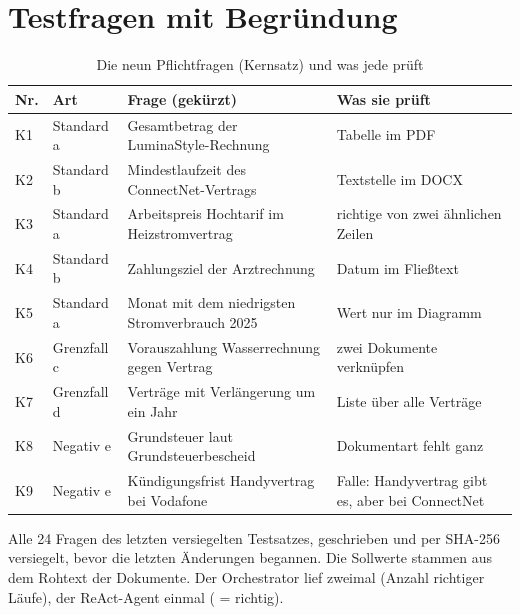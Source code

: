 
\chapter{Testfragen mit Begründung}
\label{app:testsatz}

\begin{table}[H]
    \centering\footnotesize{}
    \begin{tabularx}{\textwidth}{@{}l l Y Y@{}}
        \toprule
        \textbf{Nr.} & \textbf{Art} & \textbf{Frage (gekürzt)} & \textbf{Was sie prüft} \\
        \midrule
        K1 & Standard a & Gesamtbetrag der LuminaStyle-Rechnung & Tabelle im PDF \\
        K2 & Standard b & Mindestlaufzeit des ConnectNet-Vertrags & Textstelle im DOCX \\
        K3 & Standard a & Arbeitspreis Hochtarif im Heizstromvertrag & richtige von zwei ähnlichen Zeilen \\
        K4 & Standard b & Zahlungsziel der Arztrechnung & Datum im Fließtext \\
        K5 & Standard a & Monat mit dem niedrigsten Stromverbrauch 2025 & Wert nur im Diagramm \\
        K6 & Grenzfall c & Vorauszahlung Wasserrechnung gegen Vertrag & zwei Dokumente verknüpfen \\
        K7 & Grenzfall d & Verträge mit Verlängerung um ein Jahr & Liste über alle Verträge \\
        K8 & Negativ e & Grundsteuer laut Grundsteuerbescheid & Dokumentart fehlt ganz \\
        K9 & Negativ e & Kündigungsfrist Handyvertrag bei Vodafone & Falle: Handyvertrag gibt es, aber bei ConnectNet \\
        \bottomrule
    \end{tabularx}
    \caption{Die neun Pflichtfragen (Kernsatz) und was jede prüft}
    \label{tab:kern}
\end{table}


Alle 24 Fragen des letzten versiegelten Testsatzes, geschrieben und per SHA-256 versiegelt, bevor die letzten Änderungen begannen. Die Sollwerte stammen aus dem Rohtext der Dokumente. Der Orchestrator lief zweimal (Anzahl richtiger Läufe), der ReAct-Agent einmal (\checkmark{} = richtig).


